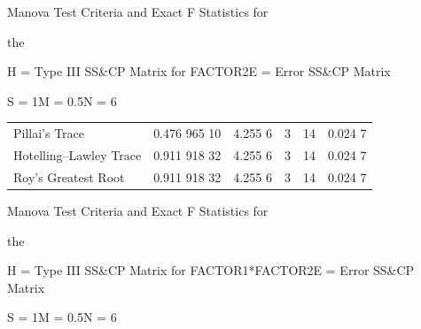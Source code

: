 

\begin{mvframe}
\ttfamily\small
{\centering Manova Test Criteria and Exact F Statistics for\par}
\vspace{6pt}
{\centering the\quad {}\par}
\vspace{8pt}

\noindent H = Type III SS\&CP Matrix for FACTOR2\hfill E = Error SS\&CP Matrix

\vspace{4pt}
{\centering S = 1\quad M = 0.5\quad N = 6\par}
\vspace{10pt}

\noindent{}
\vspace{6pt}

\begin{tabular}{@{}lrrrrr@{}}
Pillai's Trace & 0.476 965 10 & 4.255 6 & 3 & 14 & 0.024 7\\
Hotelling--Lawley Trace & 0.911 918 32 & 4.255 6 & 3 & 14 & 0.024 7\\
Roy's Greatest Root & 0.911 918 32 & 4.255 6 & 3 & 14 & 0.024 7
\end{tabular}
\vspace{20pt}

{\centering Manova Test Criteria and Exact F Statistics for\par}
\vspace{6pt}
{\centering the\quad {}\par}
\vspace{8pt}

\noindent H = Type III SS\&CP Matrix for FACTOR1*FACTOR2\hfill E = Error SS\&CP Matrix

\vspace{4pt}
{\centering S = 1\quad M = 0.5\quad N = 6\par}
\vspace{10pt}

\noindent{}
\vspace{6pt}


\end{mvframe}
